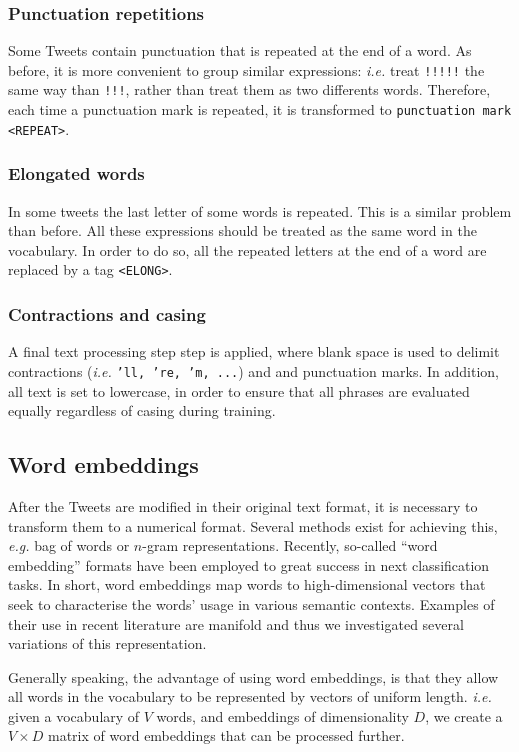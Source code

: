 \subsubsection{Punctuation repetitions}
Some Tweets contain punctuation that is repeated at the end of a word. As before, it is more convenient to group similar expressions: \emph{i.e.} treat \texttt{!!!!!} the same way than \texttt{!!!}, rather than treat them as two differents words. Therefore, each time a punctuation mark is repeated, it is transformed to \texttt{punctuation mark <REPEAT>}. 

\subsubsection{Elongated words}
In some tweets the last letter of some words is repeated. This is a similar problem than before. All these expressions should be treated as the same word in the vocabulary. In order to do so, all the repeated letters at the end of a word are replaced by a tag \texttt{<ELONG>}.

\subsubsection{Contractions and casing}
A final text processing step step is applied, where blank space is used to delimit contractions (\emph{i.e.} \texttt{'ll, 're, 'm, ...}) and and punctuation marks. In addition, all text is set to lowercase, in order to ensure that all phrases are evaluated equally regardless of casing during training.

\subsection{Word embeddings}
After the Tweets are modified in their original text format, it is necessary to transform them to a numerical format. Several methods exist for achieving this, \emph{e.g.} bag of words or $n$-gram representations. Recently, so-called ``word embedding'' formats \cite{mikolov2013efficient} have been employed to great success in next classification tasks. In short, word embeddings map words to high-dimensional vectors that seek to characterise the words' usage in various semantic contexts. Examples of their use in recent literature are manifold \cite{mikolov2013efficient, mikolov2013distributed, collobert2011natural} and thus we investigated several variations of this representation.

Generally speaking, the advantage of using word embeddings, is that they allow all words in the vocabulary to be represented by vectors of uniform length. \emph{i.e.} given a vocabulary of $V$ words, and embeddings of dimensionality $D$, we create a $V \times D$ matrix of word embeddings that can be processed further.


